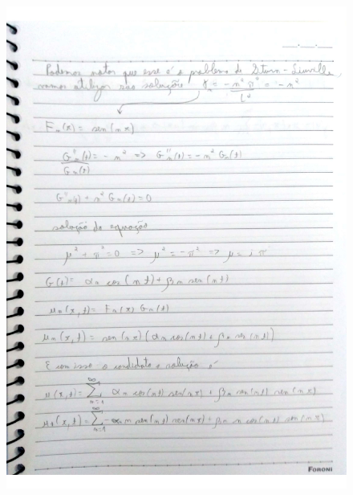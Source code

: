 \documentclass[a4paper]{article}
\begin{document}
        \begin{figure}{\textwidth}
            \centering
            \includegraphics[width=\textwidth]{Questoes-1-3_page-0014.jpg}
        \end{figure}
        
\end{document}
